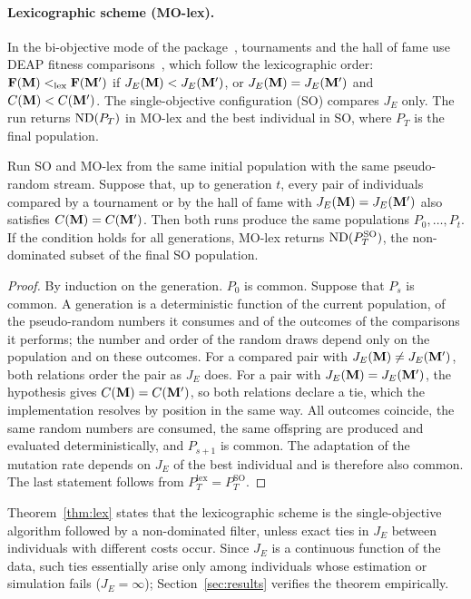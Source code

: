 \paragraph{Lexicographic scheme (MO-lex).}
In the bi-objective mode of the package~\cite{mggpy}, tournaments and the hall of fame use DEAP fitness comparisons~\cite{FDG+2012,DEAPFitness}, which follow the
lexicographic order: $\mathbf{F}(\mathbf{M})<_{\mathrm{lex}}\mathbf{F}(\mathbf{M}')$ if $J_E(\mathbf{M})<J_E(\mathbf{M}')$, or $J_E(\mathbf{M})=J_E(\mathbf{M}')$ and $C(\mathbf{M})<C(\mathbf{M}')$.
The single-objective configuration (SO) compares $J_E$ only. The run returns $\operatorname{ND}(P_T)$ in MO-lex and the best
individual in SO, where $P_T$ is the final population.

\begin{theorem}\label{thm:lex}
Run SO and MO-lex from the same initial population with the same pseudo-random stream. Suppose that, up to generation
$t$, every pair of individuals compared by a tournament or by the hall of fame with $J_E(\mathbf{M})=J_E(\mathbf{M}')$ also satisfies
$C(\mathbf{M})=C(\mathbf{M}')$. Then both runs produce the same populations $P_0,\dots,P_t$. If the condition holds for all
generations, MO-lex returns $\operatorname{ND}(P_T^{\mathrm{SO}})$, the non-dominated subset of the final SO population.
\end{theorem}
\begin{proof}
By induction on the generation. $P_0$ is common. Suppose that $P_s$ is common. A generation is a deterministic
function of the current population, of the pseudo-random numbers it consumes and of the outcomes of the comparisons it
performs; the number and order of the random draws depend only on the population and on these outcomes. For a
compared pair with $J_E(\mathbf{M})\ne J_E(\mathbf{M}')$, both relations order the pair as $J_E$ does. For a pair with
$J_E(\mathbf{M})=J_E(\mathbf{M}')$, the hypothesis gives $C(\mathbf{M})=C(\mathbf{M}')$, so both relations declare a tie, which the implementation
resolves by position in the same way. All outcomes coincide, the same random numbers are consumed, the same offspring
are produced and evaluated deterministically, and $P_{s+1}$ is common. The adaptation of the mutation rate depends
on $J_E$ of the best individual and is therefore also common. The last statement follows from $P_T^{\mathrm{lex}}=P_T^{\mathrm{SO}}$.
\end{proof}

Theorem~\ref{thm:lex} states that the lexicographic scheme is the single-objective algorithm followed by a
non-dominated filter, unless exact ties in $J_E$ between individuals with different costs occur. Since $J_E$ is a
continuous function of the data, such ties essentially arise only among individuals whose estimation or simulation
fails ($J_E=\infty$); Section~\ref{sec:results} verifies the theorem empirically.

